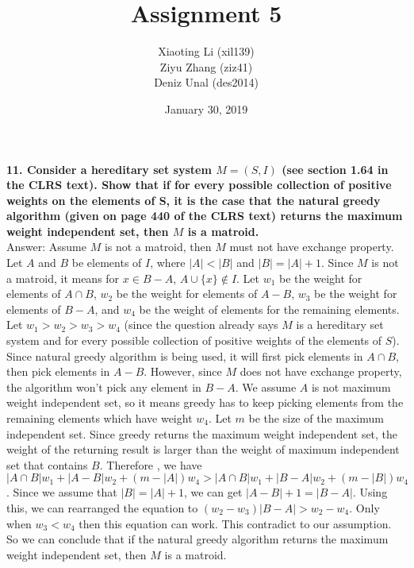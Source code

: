 \documentclass{article}
\title{Assignment 5}
\author{Xiaoting Li (xil139) \\
Ziyu Zhang (ziz41) \\
Deniz Unal (des2014)}
\date{January 30, 2019}
\begin{document}
\maketitle

\noindent
\textbf{11. Consider a hereditary set system $M = (S, I)$ (see section 1.64 in the CLRS text). Show that if for every possible collection of positive weights on the elements of S, it is the case that the natural greedy algorithm (given on page 440 of the CLRS text) returns the maximum weight independent set, then $M$ is a matroid.} \\ \newline
\noindent
Answer:
Assume $M$ is not a matroid, then $M$ must not have exchange property. Let $A$ and $B$ be elements of $I$, where $|A| < |B|$ and $|B| = |A| + 1$. Since $M$ is not a matroid, it means for $x \in B - A$, $A \cup \{x\} \notin I$. Let $w_1$ be the weight for elements of $A \cap B$, $w_2$ be the weight for elements of $A - B$, $w_3$ be the weight for elements of $B - A$, and $w_4$ be the weight of elements for the remaining elements. Let $w_1 > w_2 > w_3 > w_4$ (since the question already says $M$ is a hereditary set system and for every possible collection of positive weights of the elements of $S$). \\ \newline
\noindent
Since natural greedy algorithm is being used, it will first pick elements in $A \cap B$, then pick elements in $A - B$. However, since $M$ does not have exchange property, the algorithm won't pick any element in $B - A$. We assume $A$ is not maximum weight independent set, so it means greedy has to keep picking elements from the remaining elements which have weight $w_4$. Let $m$ be the size of the maximum independent set. Since greedy returns the maximum weight independent set, the weight of the returning result is larger than the weight of maximum independent set that contains $B$. Therefore , we have $|A \cap B|w_1 + |A - B|w_2 + (m - |A|)w_4 > |A \cap B|w_1 + |B - A|w_2 + (m - |B|)w_4$. Since we assume that $|B| = |A| + 1$, we can get $|A - B| + 1 = |B - A|$. Using this, we can rearranged the equation to $(w_2 - w_3)|B - A| > w_2 - w_4$. Only when $w_3 < w_4$ then this equation can work. This contradict to our assumption. So we can conclude that if the natural greedy algorithm returns the maximum weight independent set, then $M$ is a matroid.
\end{document}
